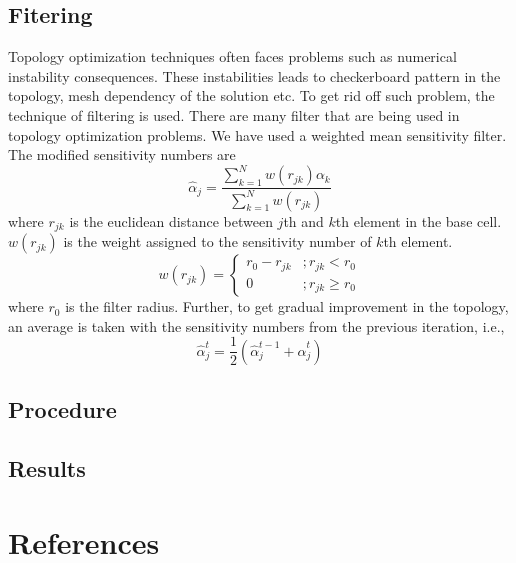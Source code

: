 \documentclass[10pt]{article}
\begin{document}
\subsection{Fitering}
Topology optimization techniques often faces problems such as numerical instability consequences. These instabilities leads to checkerboard pattern in the topology, mesh dependency of the solution etc. To get rid off such problem, the technique of filtering is used. There are many filter that are being used in topology optimization problems. We have used a weighted mean sensitivity filter. The modified sensitivity numbers are 
\begin{equation}
\hat\alpha_j = \frac{\sum_{k=1}^{N}w(r_{jk})\alpha_k}{\sum_{k=1}^Nw(r_{jk})}
\end{equation}
where $r_{jk}$ is the euclidean distance between $j$th and $k$th element in the base cell. $w(r_{jk})$ is the weight assigned to the sensitivity number of $k$th element.
\begin{equation}
w(r_{jk}) = 
\begin{cases}
r_0 - r_{jk} &; r_{jk}<r_0\\
0 &; r_{jk}\geq r_0
\end{cases}
\end{equation}
where $r_0$ is the filter radius. 
Further, to get gradual improvement in the topology, an average is taken with the sensitivity numbers from the previous iteration, i.e.,
\begin{equation}
\hat\alpha^t_j = \frac{1}{2}(\hat\alpha^{t-1}_j+\hat\alpha^t_j)
\end{equation}

\subsection{Procedure}

\subsection{Results}
\cite{first}
\cite{WEBSITE:1}

\newpage
\section{References}


\end{document}
